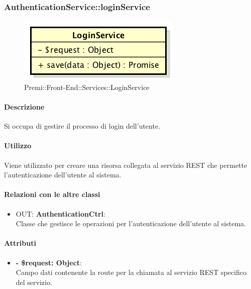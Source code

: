 		
		\subsubsection{AuthenticationService::loginService}
		\begin{figure}[h]
			\centering
				\includegraphics[width=0.4\linewidth]{img/premi_front_end_services_loginservice}
			\caption[Premi::Front-End::Services::LoginService]{Premi::Front-End::Services::LoginService}
		\end{figure}
		
		\paragraph{Descrizione}
		Si occupa di gestire il processo di login dell'utente.
		
		\paragraph{Utilizzo}
		Viene utilizzato per creare una risorsa collegata al servizio REST che permette l'autenticazione dell'utente al sistema.
		
		\paragraph{Relazioni con le altre classi}
		\begin{itemize}
			\item OUT: \textbf{AuthenticationCtrl}:\\
			Classe che gestisce le operazioni per l'autenticazione dell'utente al sistema.
		\end{itemize}
		
		\paragraph{Attributi}
		\begin{itemize}
			\item \textbf{- \$request: Object}:\\
			Campo dati contenente la route per la chiamata al servizio REST specifico del servizio.
		\end{itemize}	
		
